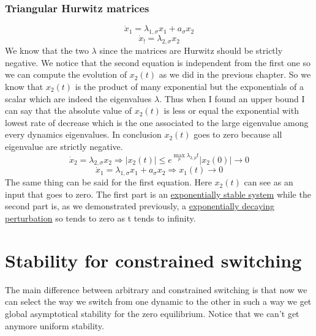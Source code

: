 \subsubsection{Triangular Hurwitz matrices}
	\[
	\dot{x}_1=\lambda_{1,\sigma}x_1+a_{\sigma}x_2\]
	\[
	\dot{x}_!=\lambda_{2,\sigma}x_2
	\]
We know that the two $\lambda$ since the matrices are Hurwitz should be strictly negative. We notice that the second equation is independent from the first one so we can compute the evolution of $x_2(t)$ as we did in the previous chapter. So we know that $x_2(t)$ is the product of many exponential but the exponentials of a scalar which are indeed the eigenvalues $\lambda$. Thus when I found an upper bound I can say that the absolute value of $x_2(t)$ is less or equal the exponential with lowest rate of decrease which is the one associated to the large eigenvalue among every dynamics eigenvalues. In conclusion $x_2(t)$ goes to zero because all eigenvalue are strictly negative.
\[
\dot{x}_2=\lambda_{2,\sigma}x_2 \Rightarrow \left|x_2(t)\right|\le e^{\max_p\lambda_{2,p}t}\left |x_2(0)\right| \to 0
\]
\[
\boxed{\dot{x}_1=\lambda_{1,\sigma}x_1}+\boxed{a_{\sigma}x_2}\Rightarrow x_1(t)\to 0
\]
The same thing can be said for the first equation. Here $x_2(t)$ can see as an input that goes to zero. The first part is an \underline{exponentially stable system} while the second part is, as we demonstrated previously, a \underline{exponentially decaying perturbation} so tends to zero as t tends to infinity.

\section{Stability for constrained switching}
The main difference between arbitrary and constrained switching is that now we can select the way we switch from one dynamic to the other  in such a way we get global asymptotical stability for the zero equilibrium. Notice that we can't get anymore uniform stability.
